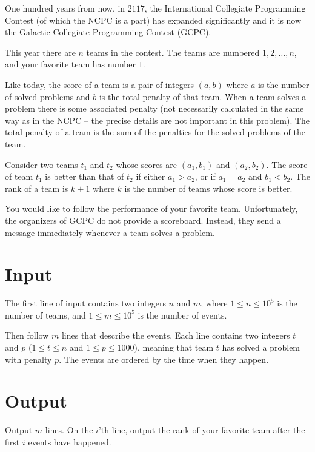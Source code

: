 
%
\noindent
One hundred years from now, in $2117$, the International Collegiate
Programming Contest (of which the NCPC is a part) has expanded
significantly and it is now the Galactic Collegiate Programming Contest
(GCPC).

This year there are $n$ teams in the contest. The teams are numbered
$1,2,\ldots,n$, and your favorite team has number $1$.

Like today, the score of a team is a pair of integers $(a,b)$
where $a$ is the number of solved problems and $b$ is the total
penalty of that team.  When a team solves a problem there is some
associated penalty (not necessarily calculated in the same way as in the NCPC -- the precise details are not important in this problem).  The total penalty of a
team is the sum of the penalties for the solved problems of the team.

Consider two teams $t_1$ and $t_2$ whose scores are
$(a_1,b_1)$ and $(a_2,b_2)$.
The score of team $t_1$ is better than that of $t_2$ if either $a_1>a_2$,
or if $a_1=a_2$ and $b_1<b_2$.
The rank of a team is $k+1$ where $k$ is the number
of teams whose score is better.

You would like to follow the performance of your favorite
team. Unfortunately,
the organizers of GCPC do not provide a
scoreboard.
Instead, they send a message immediately whenever a team solves a
problem.

\section*{Input}

The first line of input contains two integers $n$ and $m$, where $1 \le n \le 10^5$ is the number of teams, and $1 \le m \le 10^5$ is the number of events.

Then follow $m$ lines that describe the events. Each line contains
two integers $t$ and $p$ ($1 \le t \le n$ and $1 \le p \le 1000$),
meaning that team $t$ has solved a problem with penalty $p$.
The events are ordered by the time when they happen.

\section*{Output}

Output $m$ lines.  On the $i$'th line, output the rank of your
favorite team after the first $i$ events have happened.
